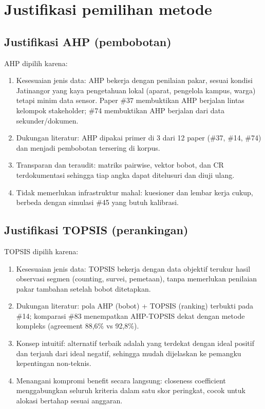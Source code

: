 \documentclass[a4paper,11pt]{article}
\begin{document}
\section{Justifikasi pemilihan metode}

\subsection*{Justifikasi AHP (pembobotan)}

AHP dipilih karena:
\begin{enumerate}
\item Kesesuaian jenis data: AHP bekerja dengan penilaian pakar, sesuai kondisi Jatinangor yang kaya pengetahuan lokal (aparat, pengelola kampus, warga) tetapi minim data sensor. Paper \#37 membuktikan AHP berjalan lintas kelompok stakeholder; \#74 membuktikan AHP berjalan dari data sekunder/dokumen.
\item Dukungan literatur: AHP dipakai primer di 3 dari 12 paper (\#37, \#14, \#74) dan menjadi pembobotan tersering di korpus.
\item Transparan dan teraudit: matriks pairwise, vektor bobot, dan CR terdokumentasi sehingga tiap angka dapat ditelusuri dan diuji ulang.
\item Tidak memerlukan infrastruktur mahal: kuesioner dan lembar kerja cukup, berbeda dengan simulasi \#45 yang butuh kalibrasi.
\end{enumerate}

\subsection*{Justifikasi TOPSIS (perankingan)}

TOPSIS dipilih karena:
\begin{enumerate}
\item Kesesuaian jenis data: TOPSIS bekerja dengan data objektif terukur hasil observasi segmen (counting, survei, pemetaan), tanpa memerlukan penilaian pakar tambahan setelah bobot ditetapkan.
\item Dukungan literatur: pola AHP (bobot) + TOPSIS (ranking) terbukti pada \#14; komparasi \#83 menempatkan AHP-TOPSIS dekat dengan metode kompleks (agreement 88,6\% vs 92,8\%).
\item Konsep intuitif: alternatif terbaik adalah yang terdekat dengan ideal positif dan terjauh dari ideal negatif, sehingga mudah dijelaskan ke pemangku kepentingan non-teknis.
\item Menangani kompromi benefit secara langsung: closeness coefficient menggabungkan seluruh kriteria dalam satu skor peringkat, cocok untuk alokasi bertahap sesuai anggaran.
\end{enumerate}
\end{document}
